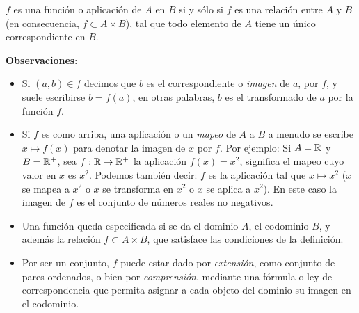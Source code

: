 \begin{fmd-definition}[Función] 
	$f$ es una función o aplicación de $A$ en $B$ si y sólo si $f$ es una relación
	entre $A$ y $B$ (en consecuencia, $f \subset A \times B$), tal que todo elemento de $A$ tiene un único correspondiente en $B$.
\end{fmd-definition}

\textbf{Observaciones}:
\begin{itemize}
	\item Si $(a, b) \in f$ decimos que $b$ es el correspondiente o \textit{imagen} de $a$,
	por $f$, y suele escribirse $b = f(a)$, en otras palabras, $b$ es el transformado de $a$
	por la función $f$.
	\item Si $f$ es como arriba, una aplicación o un \textit{mapeo} de $A$ a $B$ a menudo se escribe $x \mapsto f(x)$ para denotar la imagen de $x$ por $f$. Por ejemplo: Si $A = \mathbb{R}$ y  $B = \mathbb{R}^{+}$, sea $f: \mathbb{R} \rightarrow \mathbb{R}^{+}$ la aplicación $f(x) = x^2$, significa el mapeo cuyo valor en $x$ es $x^2$. Podemos también decir: $f$ es la aplicación tal que $x \mapsto x^2$ ($x$ se mapea a $x^2$ o $x$ se transforma en $x^2$ o $x$ se aplica a $x^2$). En este caso la imagen de $f$ es el conjunto de números reales no negativos.
	\item Una función queda especificada si se da el dominio $A$, el codominio $B$,
	y además la relación $f \subset A \times B$, que satisface las condiciones de la definición.
	\item Por ser un conjunto, $f$ puede estar dado por \textit{extensión}, como conjunto de pares ordenados, o bien por \textit{comprensión}, mediante una fórmula o ley de correspondencia que permita asignar a cada objeto del dominio su imagen en el codominio.
\end{itemize}%

